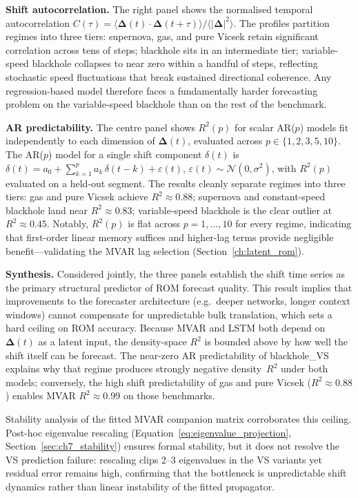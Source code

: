 \noindent\textbf{Shift autocorrelation.}
The right panel shows the normalised temporal autocorrelation
$C(\tau)=\langle\boldsymbol{\Delta}(t)\cdot\boldsymbol{\Delta}(t+\tau)\rangle
/\langle|\boldsymbol{\Delta}|^2\rangle$.
The profiles partition regimes into three tiers: supernova, gas, and pure
Vicsek retain significant correlation across tens of steps; blackhole sits
in an intermediate tier; variable-speed blackhole collapses to near zero
within a handful of steps, reflecting stochastic speed fluctuations that
break sustained directional coherence.  Any regression-based
model therefore faces a fundamentally harder forecasting problem on the
variable-speed blackhole than on the rest of the benchmark.

\noindent\textbf{AR predictability.}
The centre panel shows $R^2(p)$ for scalar AR($p$) models
fit independently to each dimension of
$\boldsymbol{\Delta}(t)$, evaluated across $p\in\{1,2,3,5,10\}$.
The AR($p$) model for a single shift component $\delta(t)$ is
$\delta(t) = a_0 + \sum_{k=1}^{p} a_k\,\delta(t-k) + \varepsilon(t)$,
$\varepsilon(t)\sim\mathcal{N}(0,\sigma^2)$,
with $R^2(p)$ evaluated on a held-out segment.
The results cleanly separate regimes into three tiers:
gas and pure Vicsek achieve $R^2\approx 0.88$;
supernova and constant-speed blackhole land near $R^2\approx 0.83$;
variable-speed blackhole is the clear outlier at $R^2\approx 0.45$.
Notably, $R^2(p)$ is flat across $p=1,\ldots,10$ for every regime,
indicating that first-order linear memory suffices and higher-lag terms
provide negligible benefit---validating the MVAR lag selection
(Section~\ref{ch:latent_rom}).

\noindent\textbf{Synthesis.}
Considered jointly, the three panels establish the shift time series as the
primary structural predictor of ROM forecast quality.  This result implies
that improvements to the forecaster architecture (e.g.\ deeper networks,
longer context windows) cannot compensate for unpredictable bulk translation,
which sets a hard ceiling on ROM accuracy.
Because MVAR and LSTM both depend on $\boldsymbol{\Delta}(t)$ as a latent input, the
density-space $R^2$ is bounded above by how well the shift itself can
be forecast.  The near-zero AR predictability of blackhole\_VS explains
why that regime produces strongly negative density~$R^2$ under both models;
conversely, the high shift predictability of gas and pure Vicsek
($R^2\approx 0.88$) enables MVAR $R^2\approx 0.99$ on those benchmarks.

Stability analysis of the fitted MVAR companion matrix corroborates this
ceiling.  Post-hoc eigenvalue rescaling
(Equation~\ref{eq:eigenvalue_projection},
Section~\ref{sec:ch7_stability}) ensures formal stability, but it does not
resolve the VS prediction failure: rescaling clips 2--3 eigenvalues in the
VS variants yet residual error remains high, confirming that the bottleneck
is unpredictable shift dynamics rather than linear instability of the fitted
propagator.

